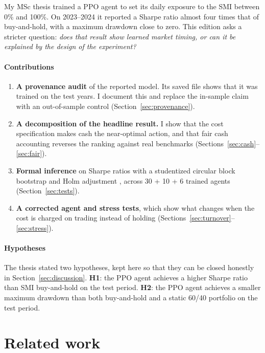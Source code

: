 \documentclass[11pt,a4paper]{article}
\begin{document}
My MSc thesis trained a PPO agent \citep{schulman2017} to set its daily exposure to the SMI between 0\% and 100\%. On 2023--2024 it reported a Sharpe ratio almost four times that of buy-and-hold, with a maximum drawdown close to zero. This edition asks a stricter question: \emph{does that result show learned market timing, or can it be explained by the design of the experiment?}

\paragraph{Contributions}
\begin{enumerate}[leftmargin=1.4em]
  \item \textbf{A provenance audit} of the reported model. Its saved file shows that it was trained on the test years. I document this and replace the in-sample claim with an out-of-sample control (Section~\ref{sec:provenance}).
  \item \textbf{A decomposition of the headline result.} I show that the cost specification makes cash the near-optimal action, and that fair cash accounting reverses the ranking against real benchmarks (Sections~\ref{sec:cash}--\ref{sec:fair}).
  \item \textbf{Formal inference} on Sharpe ratios with a studentized circular block bootstrap \citep{ledoit2008} and Holm adjustment \citep{holm1979}, across 30 + 10 + 6 trained agents (Section~\ref{sec:tests}).
  \item \textbf{A corrected agent and stress tests}, which show what changes when the cost is charged on trading instead of holding (Sections~\ref{sec:turnover}--\ref{sec:stress}).
\end{enumerate}

\paragraph{Hypotheses} The thesis stated two hypotheses, kept here so that they can be closed honestly in Section~\ref{sec:discussion}.
\textbf{H1}: the PPO agent achieves a higher Sharpe ratio than SMI buy-and-hold on the test period.
\textbf{H2}: the PPO agent achieves a smaller maximum drawdown than both buy-and-hold and a static 60/40 portfolio on the test period.

\section{Related work}
\end{document}
